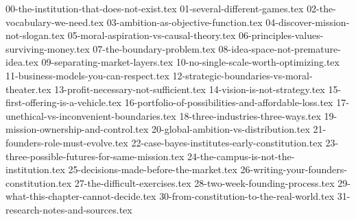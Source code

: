
{00-the-institution-that-does-not-exist.tex}
{01-several-different-games.tex}
{02-the-vocabulary-we-need.tex}
{03-ambition-as-objective-function.tex}
{04-discover-mission-not-slogan.tex}
{05-moral-aspiration-vs-causal-theory.tex}
{06-principles-values-surviving-money.tex}
{07-the-boundary-problem.tex}
{08-idea-space-not-premature-idea.tex}
{09-separating-market-layers.tex}
{10-no-single-scale-worth-optimizing.tex}
{11-business-models-you-can-respect.tex}
{12-strategic-boundaries-vs-moral-theater.tex}
{13-profit-necessary-not-sufficient.tex}
{14-vision-is-not-strategy.tex}
{15-first-offering-is-a-vehicle.tex}
{16-portfolio-of-possibilities-and-affordable-loss.tex}
{17-unethical-vs-inconvenient-boundaries.tex}
{18-three-industries-three-ways.tex}
{19-mission-ownership-and-control.tex}
{20-global-ambition-vs-distribution.tex}
{21-founders-role-must-evolve.tex}
{22-case-bayes-institutes-early-constitution.tex}
{23-three-possible-futures-for-same-mission.tex}
{24-the-campus-is-not-the-institution.tex}
{25-decisions-made-before-the-market.tex}
{26-writing-your-founders-constitution.tex}
{27-the-difficult-exercises.tex}
{28-two-week-founding-process.tex}
{29-what-this-chapter-cannot-decide.tex}
{30-from-constitution-to-the-real-world.tex}
{31-research-notes-and-sources.tex}
